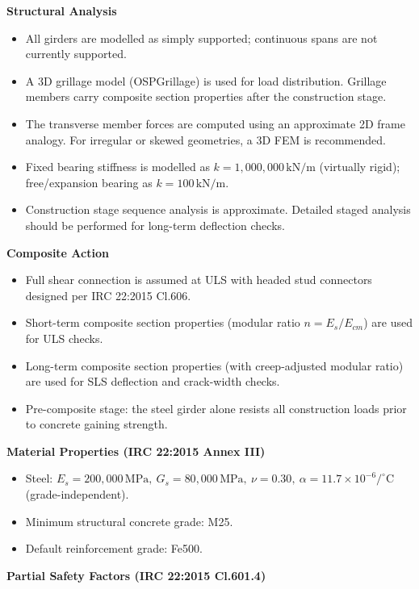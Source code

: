 \documentclass[12pt,a4paper]{report}
\numberwithin{table}{chapter}
\numberwithin{figure}{chapter}
\begin{document}
\textbf{Structural Analysis}

\begin{itemize}
    \item All girders are modelled as simply supported; continuous spans are not currently supported.
    \item A 3D grillage model (OSPGrillage) is used for load distribution. Grillage members carry composite section properties after the construction stage.
    \item The transverse member forces are computed using an approximate 2D frame analogy. For irregular or skewed geometries, a 3D FEM is recommended.
    \item Fixed bearing stiffness is modelled as $k = 1{,}000{,}000 \,\text{kN/m}$ (virtually rigid); free/expansion bearing as $k = 100 \, \text{kN/m}$.
    \item Construction stage sequence analysis is approximate. Detailed staged analysis should be performed for long-term deflection checks.
\end{itemize}

\textbf{Composite Action}

\begin{itemize}
    \item Full shear connection is assumed at ULS with headed stud connectors designed per IRC 22:2015 Cl.606.
    \item Short-term composite section properties (modular ratio $n = E_s/E_{cm}$) are used for ULS checks.
    \item Long-term composite section properties (with creep-adjusted modular ratio) are used for SLS deflection and crack-width checks.
    \item Pre-composite stage: the steel girder alone resists all construction loads prior to concrete gaining strength.
\end{itemize}


\textbf{Material Properties (IRC 22:2015 Annex III)}

\begin{itemize}
\item Steel: $E_s = 200{,}000 \, \text{MPa}, \ G_s = 80{,}000 \, \text{MPa}, \ \nu = 0.30, \ \alpha = 11.7 \times 10^{-6}/^\circ\mathrm{C}$ (grade-independent).
\item Minimum structural concrete grade: M25.
\item Default reinforcement grade: Fe500.
\end{itemize}

\textbf{Partial Safety Factors (IRC 22:2015 Cl.601.4)}
\end{document}
